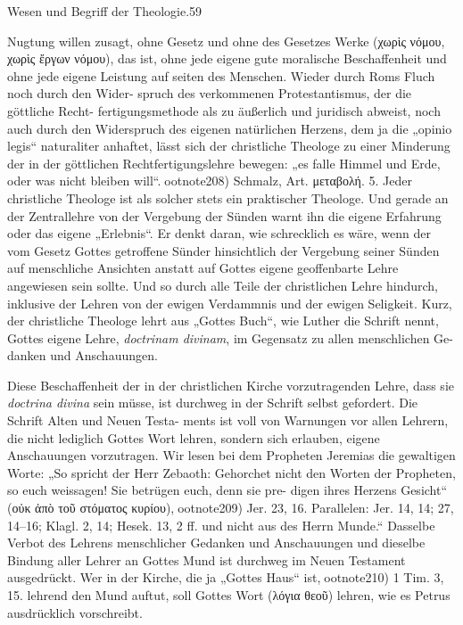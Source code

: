 Wesen und Begriff der Theologie.\hfill 59

Nugtung willen zusagt, ohne Gesetz und ohne des Gesetzes Werke
(\textgreek{χωρὶς νόμου, χωρὶς ἔργων νόμου}), das ist, ohne jede eigene gute
moralische Beschaffenheit und ohne jede eigene Leistung auf seiten
des Menschen. Wieder durch Roms Fluch noch durch den Wider-
spruch des verkommenen Protestantismus, der die göttliche Recht-
fertigungsmethode als zu äußerlich und juridisch abweist, noch auch
durch den Widerspruch des eigenen natürlichen Herzens, dem ja die
„opinio legis“ naturaliter anhaftet, lässt sich der christliche Theologe
zu einer Minderung der in der göttlichen Rechtfertigungslehre
bewegen: „es falle Himmel und Erde, oder was nicht bleiben will“.ootnote{208) Schmalz, Art. \textgreek{μεταβολή}. 5.}
Jeder christliche Theologe ist als solcher stets ein praktischer
Theologe. Und gerade an der Zentrallehre von der Vergebung der
Sünden warnt ihn die eigene Erfahrung oder das eigene „Erlebnis“.
Er denkt daran, wie schrecklich es wäre, wenn der vom Gesetz Gottes
getroffene Sünder hinsichtlich der Vergebung seiner Sünden auf
menschliche Ansichten anstatt auf Gottes eigene geoffenbarte Lehre
angewiesen sein sollte. Und so durch alle Teile der christlichen
Lehre hindurch, inklusive der Lehren von der ewigen Verdammnis
und der ewigen Seligkeit. Kurz, der christliche Theologe lehrt aus
„Gottes Buch“, wie Luther die Schrift nennt, Gottes eigene
Lehre, \emph{doctrinam divinam}, im Gegensatz zu allen menschlichen Ge-
danken und Anschauungen.

Diese Beschaffenheit der in der christlichen Kirche vorzutragenden
Lehre, dass sie \emph{doctrina divina} sein müsse, ist durchweg in der
Schrift selbst gefordert. Die Schrift Alten und Neuen Testa-
ments ist voll von Warnungen vor allen Lehrern, die nicht lediglich
Gottes Wort lehren, sondern sich erlauben, eigene Anschauungen
vorzutragen. Wir lesen bei dem Propheten Jeremias die gewaltigen
Worte: „So spricht der Herr Zebaoth: Gehorchet nicht den Worten
der Propheten, so euch weissagen! Sie betrügen euch, denn sie pre-
digen ihres Herzens Gesicht“ (\textgreek{οὐκ ἀπὸ τοῦ στόματος κυρίου}),ootnote{209) Jer. 23, 16. Parallelen: Jer. 14, 14; 27, 14--16; Klagl. 2, 14; Hesek. 13, 2 ff.}
und nicht aus des Herrn Munde.“ Dasselbe Verbot
des Lehrens menschlicher Gedanken und Anschauungen und dieselbe
Bindung aller Lehrer an Gottes Mund ist durchweg im Neuen
Testament ausgedrückt. Wer in der Kirche, die ja „Gottes Haus“
ist,ootnote{210) 1 Tim. 3, 15.} lehrend den Mund auftut, soll Gottes Wort (\textgreek{λόγια θεοῦ})
lehren, wie es Petrus ausdrücklich vorschreibt.